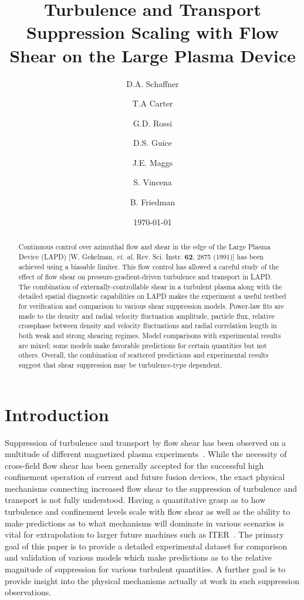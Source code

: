 \documentclass[aip,pop,amsmath,amssymb,preprint,superscriptaddress]{revtex4-1} %
\begin{document}
\title{Turbulence and Transport Suppression Scaling with Flow Shear on the Large Plasma Device}
\author{D.A. Schaffner}
\author{T.A Carter}
\author{G.D. Rossi}
\author{D.S. Guice}
\author{J.E. Maggs}
\author{S. Vincena}
\author{B. Friedman}
\date{\today}
\begin{abstract}
Continuous control over azimuthal flow and shear in the edge of the Large Plasma Device (LAPD) [W. Gekelman, \textit{et. al}, Rev. Sci. Instr. \textbf{62}, 2875 (1991)] has been achieved using a biasable limiter.  This flow control has allowed a careful study of the effect of flow shear on pressure-gradient-driven turbulence and transport in LAPD. The combination of externally-controllable shear in a turbulent plasma along with the detailed spatial diagnostic capabilities on LAPD makes the experiment a useful testbed for verification and comparison to various shear suppression models. Power-law fits are made to the density and radial velocity fluctuation amplitude, particle flux, relative crossphase between density and velocity fluctuations and radial correlation length in both weak and strong shearing regimes. Model comparisons with experimental results are mixed; some models make favorable predictions for certain quantities but not others. Overall, the combination of scattered predictions and experimental results suggest that shear suppression may be turbulence-type dependent.
\end{abstract}
\maketitle

\section{Introduction}

Suppression of turbulence and transport by flow shear has been observed on a multitude of different magnetized plasma experiments~\cite{burrell99,oost03,sakai93}. While the necessity of cross-field flow shear has been generally accepted for the successful high confinement operation of current and future fusion devices, the exact physical mechanisms connecting increased flow shear to the suppression of turbulence and transport is not fully understood. Having a quantitative grasp as to how turbulence and confinement levels scale with flow shear as well as the ability to make predictions as to what mechanisms will dominate in various scenarios is vital for extrapolation to larger future machines such as ITER~\cite{burrell97,terry00}. The primary goal of this paper is to provide a detailed experimental dataset for comparison and validation of various models which make predictions as to the relative magnitude of suppression for various turbulent quantities. A further goal is to provide insight into the physical mechanisms actually at work in such suppression observations.
\end{document}
